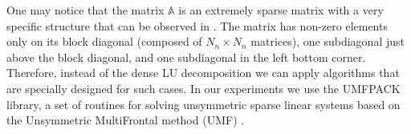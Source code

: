 One may notice that the matrix $\mathbb{A}$ is an extremely sparse matrix with a very specific structure that can be observed in . The matrix has non-zero elements only on its block diagonal (composed of $N_n \times N_n$ matrices), one subdiagonal just above the block diagonal, and one subdiagonal in the left bottom corner. Therefore, instead of the dense LU decomposition we can apply algorithms that are specially designed for such cases.
In our experiments we use the UMFPACK library, a set of routines for solving unsymmetric sparse linear systems based on the Unsymmetric MultiFrontal method (UMF) \cite{umfpack2004}.
